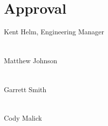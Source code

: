 \documentclass[10pt,letterpaper,onecolumn,draftclsnofoot]{IEEEtran}
\begin{document}
\section*{Approval}
\vspace{2cm}
\noindent Kent Helm, Engineering Manager\hspace{0.7cm} \makebox[1.5in]
{\hrulefill}\\\\\\
Matthew Johnson\hspace{0.3cm} \makebox[1.5in]{\hrulefill}\\\\\\
Garrett Smith\hspace{0.7cm} \makebox[1.5in]{\hrulefill}\\\\\\
Cody Malick\hspace{0.7cm} \makebox[1.5in]{\hrulefill}\\\\\\
\end{document}

